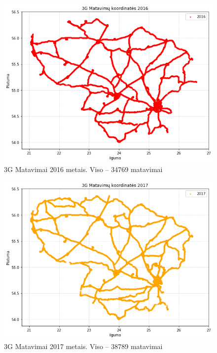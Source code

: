 \documentclass{VUMIFPSbakalaurinis}
\begin{document}
\begin{figure}[H]
	\centering
	\includegraphics[scale=0.5]{img/3G-3}
	\caption{3G Matavimai 2016 metais. Viso – 34769 matavimai}
	\label{img:3G-3}
\end{figure}
\begin{figure}[H]
	\centering
	\includegraphics[scale=0.5]{img/3G-4}
	\caption{3G Matavimai 2017 metais. Viso – 38789 matavimai}
	\label{img:3G-4}
\end{figure}
\end{document}
